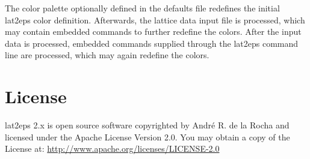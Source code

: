 \documentclass[a4paper]{article}
\begin{document}
The color palette optionally defined in the defaults file redefines the initial lat2eps color definition. Afterwards, the lattice data input file is processed, which may contain embedded commands to further redefine the colors. After the input data is processed, embedded commands supplied through the lat2eps command line are processed, which may again redefine the colors.


\section{License}

lat2eps 2.x is open source software copyrighted by André R. de la Rocha and licensed under the Apache License Version 2.0. You may obtain a copy of the License at: \url{http://www.apache.org/licenses/LICENSE-2.0}
\end{document}
